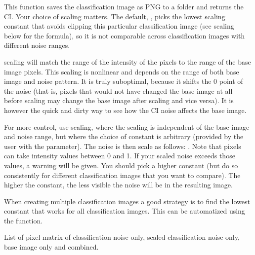 \documentclass[letterpaper]{book}
\begin{document}
%
\begin{Details}
This function saves the classification image as PNG to a folder and returns the CI. Your choice of scaling
matters. The default, , picks the lowest scaling constant that avoids clipping this
particular classification image (see  scaling below for the formula), so it is not
comparable across classification images with different noise ranges.

 scaling will match the range of the intensity of the pixels to
the range of the base image pixels. This scaling is nonlinear and depends on the range of both base image
and noise pattern. It is truly suboptimal, because it shifts the 0 point of the noise (that is, pixels that would
not have changed the base image at all before scaling may change the base image after scaling and vice versa). It is
however the quick and dirty way to see how the CI noise affects the base image.

For more control, use  scaling, where the scaling is independent of
the base image and noise range, but where the choice of constant is arbitrary (provided by the user with
the  parameter). The noise is then scale as follows: .
Note that pixels can take intensity values between 0 and 1. If your scaled noise exceeds those values,
a warning will be given. You should pick a higher constant (but do so consistently for different classification images
that you want to compare). The higher the constant, the less visible the noise will be in the resulting image.

When creating multiple classification images a good strategy is to find the lowest constant that works for all
classification images. This can be automatized using the  function.
\end{Details}
%
\begin{Value}
List of pixel matrix of classification noise only, scaled classification noise only, base image only and combined.
\end{Value}
%
\begin{Examples}
\end{Examples}
\end{document}
